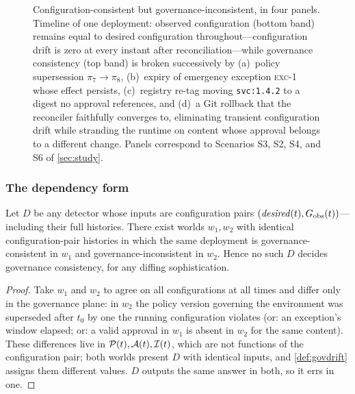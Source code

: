 \begin{figure}[t]
\centering
\resizebox{\textwidth}{!}{}
\caption{Configuration-consistent but governance-inconsistent, in four
panels. Timeline of one deployment: observed configuration (bottom band)
remains equal to desired configuration throughout---configuration drift is
zero at every instant after reconciliation---while governance consistency
(top band) is broken successively by (a)~policy supersession
$\pi_7 \to \pi_8$, (b)~expiry of emergency exception \textsc{exc-1} whose
effect persists, (c)~registry re-tag moving \texttt{svc:1.4.2} to a digest no
approval references, and (d)~a Git rollback that the reconciler faithfully
converges to, eliminating transient configuration drift while stranding the
runtime on content whose approval belongs to a different change. Panels
correspond to Scenarios S3, S2, S4, and S6 of \cref{sec:study}.}
\label{fig:example}
\end{figure}

\subsubsection{The dependency form}
\begin{proposition}
\label{prop:impossible}
Let $D$ be any detector whose inputs are configuration pairs
$(\mathit{desired}(t), G_{\mathrm{obs}}(t))$---including their full histories. There
exist worlds $w_1, w_2$ with identical configuration-pair histories in which
the same deployment is governance-consistent in $w_1$ and
governance-inconsistent in $w_2$. Hence no such $D$ decides governance
consistency, for any diffing sophistication.
\end{proposition}
\begin{proof}
Take $w_1$ and $w_2$ to agree on all configurations at all times and differ
only in the governance plane: in $w_2$ the policy version governing the
environment was superseded after $t_0$ by one the running configuration
violates (or: an exception's window elapsed; or: a valid approval in $w_1$ is
absent in $w_2$ for the same content). These differences live in
$\mathcal{P}(t), \mathcal{A}(t), \mathcal{I}(t)$, which are not functions of the configuration
pair; both worlds present $D$ with identical inputs, and
\cref{def:govdrift} assigns them different values. $D$ outputs the same answer
in both, so it errs in one.
\end{proof}

